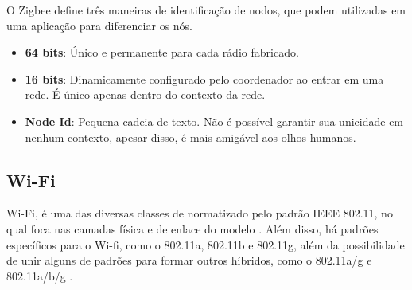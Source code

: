 
O Zigbee define três maneiras de identificação de nodos, que podem utilizadas em uma aplicação para 
diferenciar os nós.

\begin{itemize} \parskip -4pt
	\item \textbf{64 bits}: Único e permanente para cada rádio fabricado.
	\item \textbf{16 bits}: Dinamicamente configurado pelo coordenador ao entrar em uma rede. É único apenas 
	dentro do contexto da rede.
	\item \textbf{Node Id}: Pequena cadeia de texto. Não é possível garantir sua unicidade em nenhum 
	contexto, apesar disso, é mais amigável aos olhos humanos.
\end{itemize}









\subsection{Wi-Fi}
Wi-Fi, é uma das diversas classes de  normatizado pelo padrão IEEE 802.11, no qual foca nas camadas física e de enlace do modelo  \cite{Gast2005}. 
Além disso, há padrões específicos para o Wi-fi, como o 802.11a, 802.11b e 802.11g,  além da possibilidade de unir alguns de padrões para formar outros híbridos, como o 802.11a/g e 802.11a/b/g \cite{Kurose2012}. 


